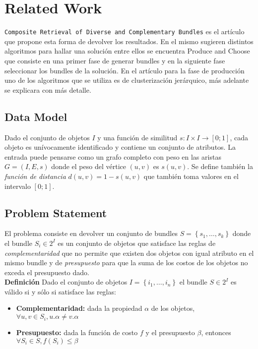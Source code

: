 \section{Related Work}
\texttt{Composite Retrieval of Diverse and Complementary Bundles} es el artículo que propone esta forma de devolver los resultados. En el mismo sugieren distintos algoritmos para hallar una solución entre ellos se encuentra Produce and Choose que consiste en una primer fase de generar bundles y en la siguiente fase seleccionar los bundles de la solución. En el artículo para la fase de producción uno de los algoritmos que se utiliza es de clusterización jerárquico, más adelante se explicara con más detalle.
\subsection{Data Model}
Dado el conjunto de objetos $I$ y una función de similitud $ s: I \times I \rightarrow [0;1]$, cada objeto es unívocamente identificado y contiene un conjunto de atributos. La entrada puede pensarse como un grafo completo con peso en las aristas $G=(I,E,s)$ donde el peso del vértice $(u,v)$ es $s(u,v)$. Se define también la \textit{función de distancia} $d(u,v) = 1 - s(u,v)$ que también toma valores en el intervalo $[0;1]$.
\subsection{Problem Statement}
El problema consiste en devolver un conjunto de bundles $S = \left\{s_1, \ldots, s_k\right\}$ donde el bundle $S_i \in 2^{I}$ es un conjunto de objetos que satisface las reglas de \textit{complementaridad} que no permite que existen dos objetos con igual atributo en el mismo bundle y de \textit{presupuesto} para que la suma de los costos de los objetos no exceda el presupuesto dado.\\
\textbf{Definición} Dado el conjunto de objetos $I=\left\{i_1,\ldots, i_n\right\}$ el bundle $S \in 2^{I}$ es válido si y sólo si satisface las reglas:
\begin{itemize}
	\item \textbf{Complementaridad:} dada la propiedad $\alpha$ de los objetos, $\forall u,v \in S_i, u.\alpha \neq v.\alpha$
	\item \textbf{Presupuesto:} dada la función de costo $f$ y el presupuesto $\beta$, entonces $\forall S_i \in S, f(S_i) \leq \beta$
\end{itemize}

